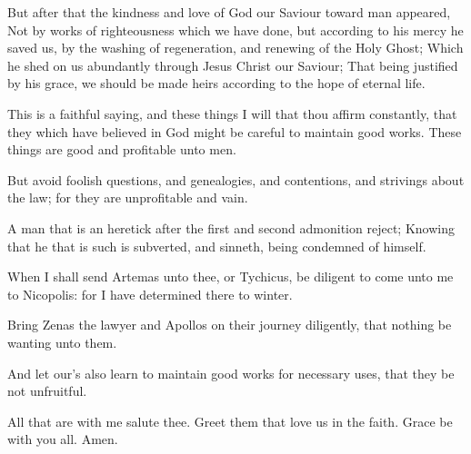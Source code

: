 \verse But after that the kindness and love of God our Saviour toward man appeared, \verse Not by works of righteousness which we have done, but according to his mercy he saved us, by the washing of regeneration, and renewing of the Holy Ghost; \verse Which he shed on us abundantly through Jesus Christ our Saviour; \verse That being justified by his grace, we should be made heirs according to the hope of eternal life.

\verse This is a faithful saying, and these things I will that thou affirm constantly, that they which have believed in God might be careful to maintain good works. These things are good and profitable unto men.

\verse But avoid foolish questions, and genealogies, and contentions, and strivings about the law; for they are unprofitable and vain.

\verse A man that is an heretick after the first and second admonition reject; \verse Knowing that he that is such is subverted, and sinneth, being condemned of himself.

\verse When I shall send Artemas unto thee, or Tychicus, be diligent to come unto me to Nicopolis: for I have determined there to winter.

\verse Bring Zenas the lawyer and Apollos on their journey diligently, that nothing be wanting unto them.

\verse And let our's also learn to maintain good works for necessary uses, that they be not unfruitful.

\verse All that are with me salute thee. Greet them that love us in the faith. Grace be with you all. Amen.

